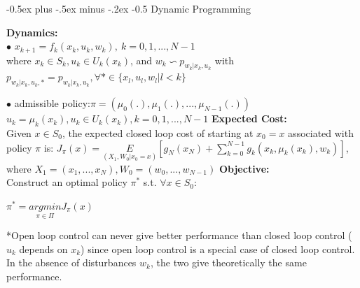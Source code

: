 \documentclass[10pt,landscape]{article}
\makeatletter
\renewcommand{\section}{\@startsection{section}{1}{0mm}%
                                {-0.5ex plus -.5ex minus -.2ex}%
                                {-0.5\baselineskip}%
                                {\normalfont\small\bfseries}}
\makeatother
\begin{document}
\raggedright

\scriptsize

\begin{multicols*}{4}

\setlength{\columnseprule}{0.25pt}
\setlength{\premulticols}{0.25pt}
\setlength{\postmulticols}{0.25pt}
\setlength{\multicolsep}{0.25pt}
\setlength{\columnsep}{0.25pt}

\section{Dynamic Programming}

\textbf{Dynamics:} \\
$ \bullet$ $x_{k+1}=f_k(x_k, u_k, w_k),\ k = 0,1,...,N-1$\\
where $x_k \in S_k, u_k \in U_k(x_k)$, and $w_k \backsim p_{w_k|x_k,u_k}$ with $p_{w_k|x_k,u_k,*}=p_{w_k|x_k,u_k}, \forall * \in \{ x_l, u_l, w_l | l<k\}$

$\bullet$ admissible policy:$\pi = (\mu_0(.),\mu_1(.),...,\mu_{N-1}(.))$\\
$u_k = \mu_k(x_k), u_k \in U_k(x_k), k=0,1,...,N-1$
\textbf{Expected Cost:}\\
Given $x\in S_0$, the expected closed loop cost of starting at $x_0 = x$ associated with policy $\pi$ is:
$J_{\pi}(x) = \underset{(X_1, W_0|x_0=x)}{E} [g_N(x_N) + \sum_{k=0}^{N-1} g_k(x_k, \mu_k(x_k), w_k)]$,\\
where $X_1 = (x_1,...,x_N), W_0 = (w_0, ...,w_{N-1})$
\textbf{Objective:}\\
Construct an optimal policy $\pi ^ *$ s.t. $\forall x \in S_0$:\\
\begin{center}
	$\pi ^ * = \underset{\pi \in \Pi}{argmin} J_{\pi}(x)$
\end{center}

*Open loop control can never give better performance than closed loop control ($u_k$ depends on $x_k$)
since open loop control is a special case of closed loop control.
In the absence of disturbances $w_k$, the two give theoretically the same
performance.
\\


\end{multicols*}
\end{document}
